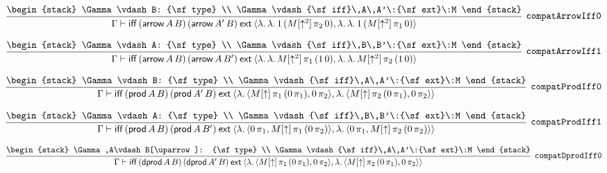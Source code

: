 \[
\infer[{\tt compatArrowIff0}]{\Gamma \vdash {\sf iff}\,({\sf arrow}\,A\,B)\,({\sf arrow}\,A'\,B)\:{\sf ext}\:\langle \lambda .\,\lambda .\,1\,(M[\uparrow^2]\, \pi_2\,0),\lambda .\,\lambda .\,1\,(M[\uparrow^2]\, \pi_1\,0)\rangle }{
\begin{stack}
\Gamma \vdash B: {\sf type}
\\
\Gamma \vdash {\sf iff}\,A\,A'\:{\sf ext}\:M
\end{stack}}
\]

\[
\infer[{\tt compatArrowIff1}]{\Gamma \vdash {\sf iff}\,({\sf arrow}\,A\,B)\,({\sf arrow}\,A\,B')\:{\sf ext}\:\langle \lambda .\,\lambda .\,M[\uparrow^2]\, \pi_1\,(1\,0),\lambda .\,\lambda .\,M[\uparrow^2]\, \pi_2\,(1\,0)\rangle }{
\begin{stack}
\Gamma \vdash A: {\sf type}
\\
\Gamma \vdash {\sf iff}\,B\,B'\:{\sf ext}\:M
\end{stack}}
\]

\[
\infer[{\tt compatProdIff0}]{\Gamma \vdash {\sf iff}\,({\sf prod}\,A\,B)\,({\sf prod}\,A'\,B)\:{\sf ext}\:\langle \lambda .\,\langle M[\uparrow ]\, \pi_1\,(0\, \pi_1),0\, \pi_2\rangle ,\lambda .\,\langle M[\uparrow ]\, \pi_2\,(0\, \pi_1),0\, \pi_2\rangle \rangle }{
\begin{stack}
\Gamma \vdash B: {\sf type}
\\
\Gamma \vdash {\sf iff}\,A\,A'\:{\sf ext}\:M
\end{stack}}
\]

\[
\infer[{\tt compatProdIff1}]{\Gamma \vdash {\sf iff}\,({\sf prod}\,A\,B)\,({\sf prod}\,A\,B')\:{\sf ext}\:\langle \lambda .\,\langle 0\, \pi_1,M[\uparrow ]\, \pi_1\,(0\, \pi_2)\rangle ,\lambda .\,\langle 0\, \pi_1,M[\uparrow ]\, \pi_2\,(0\, \pi_2)\rangle \rangle }{
\begin{stack}
\Gamma \vdash A: {\sf type}
\\
\Gamma \vdash {\sf iff}\,B\,B'\:{\sf ext}\:M
\end{stack}}
\]

\[
\infer[{\tt compatDprodIff0}]{\Gamma \vdash {\sf iff}\,({\sf dprod}\,A\,B)\,({\sf dprod}\,A'\,B)\:{\sf ext}\:\langle \lambda .\,\langle M[\uparrow ]\, \pi_1\,(0\, \pi_1),0\, \pi_2\rangle ,\lambda .\,\langle M[\uparrow ]\, \pi_2\,(0\, \pi_1),0\, \pi_2\rangle \rangle }{
\begin{stack}
\Gamma ,A\vdash B[\uparrow ]: {\sf type}
\\
\Gamma \vdash {\sf iff}\,A\,A'\:{\sf ext}\:M
\end{stack}}
\]


